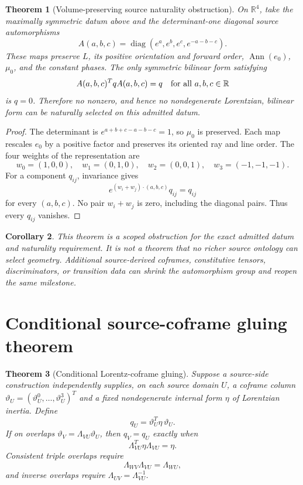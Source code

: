 \documentclass[11pt]{article}
\newtheorem{theorem}{Theorem}
\newtheorem{corollary}[theorem]{Corollary}
\newcommand{\Ann}{\operatorname{Ann}}
\newcommand{\diag}{\operatorname{diag}}
\begin{document}
\begin{theorem}[Volume-preserving source naturality obstruction]
\label{thm:naturality}
On \(\mathbb R^4\), take the maximally symmetric datum above and the
determinant-one diagonal source automorphisms
\[
 A(a,b,c)=
 \diag\!\left(e^a,e^b,e^c,e^{-a-b-c}\right).
\]
These maps preserve \(L\), its positive orientation and forward order,
\(\Ann(e_0)\), \(\mu_0\), and the constant phases. The only symmetric
bilinear form satisfying
\[
 A(a,b,c)^TqA(a,b,c)=q
 \quad\hbox{for all }a,b,c\in\mathbb R
\]
is \(q=0\). Therefore no nonzero, and hence no nondegenerate Lorentzian,
bilinear form can be naturally selected on this admitted datum.
\end{theorem}

\begin{proof}
The determinant is
\(e^{a+b+c-a-b-c}=1\), so \(\mu_0\) is preserved. Each map rescales
\(e_0\) by a positive factor and preserves its oriented ray and line order.
The four weights of the representation are
\[
 w_0=(1,0,0),\quad
 w_1=(0,1,0),\quad
 w_2=(0,0,1),\quad
 w_3=(-1,-1,-1).
\]
For a component \(q_{ij}\), invariance gives
\[
 e^{(w_i+w_j)\cdot(a,b,c)}q_{ij}=q_{ij}
\]
for every \((a,b,c)\). No pair \(w_i+w_j\) is zero, including the diagonal
pairs. Thus every \(q_{ij}\) vanishes.
\end{proof}

\begin{corollary}
This theorem is a scoped obstruction for the exact admitted datum and
naturality requirement. It is not a theorem that no richer source ontology
can select geometry. Additional source-derived coframes, constitutive
tensors, discriminators, or transition data can shrink the automorphism group
and reopen the same milestone.
\end{corollary}

\section{Conditional source-coframe gluing theorem}

\begin{theorem}[Conditional Lorentz-coframe gluing]
\label{thm:gluing}
Suppose a source-side construction independently supplies, on each source
domain \(U\), a coframe column
\(\vartheta_U=(\vartheta_U^0,\ldots,\vartheta_U^3)^T\) and a fixed
nondegenerate internal form \(\eta\) of Lorentzian inertia. Define
\[
 q_U=\vartheta_U^T\eta\,\vartheta_U.
\]
If on overlaps
\(\vartheta_V=\Lambda_{VU}\vartheta_U\), then \(q_V=q_U\) exactly when
\[
 \Lambda_{VU}^T\eta\Lambda_{VU}=\eta.
\]
Consistent triple overlaps require
\[
 \Lambda_{WV}\Lambda_{VU}=\Lambda_{WU},
\]
and inverse overlaps require
\(\Lambda_{UV}=\Lambda_{VU}^{-1}\).
\end{theorem}
\end{document}
